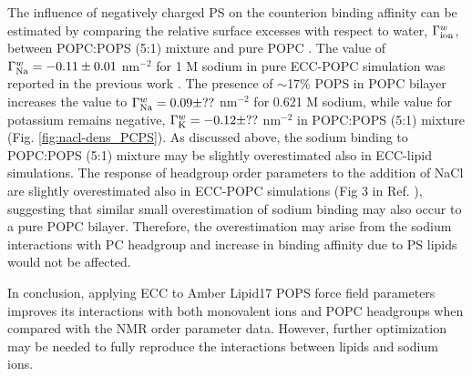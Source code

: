 \documentclass[journal=jpcbfk,manuscript=article]{achemso}
\begin{document}
% 
%
The influence of negatively charged PS on the counterion binding affinity can
be estimated by comparing the relative surface excesses with respect to water, $\Gamma ^{w} _{\rm ion}$,
between POPC:POPS (5:1) mixture and pure POPC \cite{melcr18}.
The value of $\Gamma ^{w} _{\rm Na}=-0.11 \pm 0.01$ nm$^{-2}$ for 1 M sodium in pure ECC-POPC
simulation was reported in the previous work \cite{melcr18}.
The presence of $\sim$17\% POPS in POPC bilayer increases the
value to $\Gamma ^{w} _{\rm Na}=0.09 \pm ??$ nm$^{-2}$ 
for 0.621 M sodium, while value for potassium remains negative,
$\Gamma ^{w} _{\rm K}=-0.12 \pm ??$ nm$^{-2}$  in POPC:POPS (5:1) mixture (Fig. \ref{fig:nacl-dens_PCPS}).
As discussed above, the sodium binding to POPC:POPS (5:1) mixture may be slightly overestimated also in
ECC-lipid simulations. The response of headgroup order parameters to the addition of NaCl are
slightly overestimated also in ECC-POPC simulations (Fig 3 in Ref. ),
suggesting that similar small overestimation of sodium binding may also occur to a pure POPC bilayer.
Therefore, the overestimation may arise from the sodium interactions with PC headgroup and
increase in binding affinity due to PS lipids would not be affected.

In conclusion, applying ECC to Amber Lipid17 POPS force field parameters improves its
interactions with both monovalent ions and POPC headgroups when compared with the NMR order parameter data.
However, further optimization may be needed to fully reproduce the interactions between lipids and
sodium ions.
\end{document}
